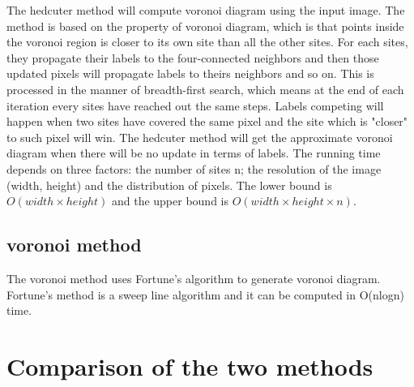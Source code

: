 \documentclass[11pt]{article}
\begin{document}
The hedcuter method will compute voronoi diagram using the input image. The method is based on the property of voronoi diagram, which is that points inside the voronoi region is closer to its own site than all the other sites. For each sites, they propagate their labels to the four-connected neighbors and then those updated pixels will propagate labels to theirs neighbors and so on. This is processed in the manner of breadth-first search, which means at the end of each iteration every sites have reached out the same steps. Labels competing will happen when two sites have covered the same pixel and the site which is "closer" to such pixel will win. The hedcuter method will get the approximate voronoi diagram when there will be no update in terms of labels. The running time depends on three factors: the number of sites n; the resolution of the image (width, height) and the distribution of pixels. The lower bound is $O(width\times height)$ and the upper bound is $O(width\times height \times n)$.

\subsection{voronoi method}
The voronoi method uses Fortune's algorithm to generate voronoi diagram. Fortune's method is a sweep line algorithm and it can be computed in O(nlogn) time. 


\section{Comparison of the two methods}
\end{document}
